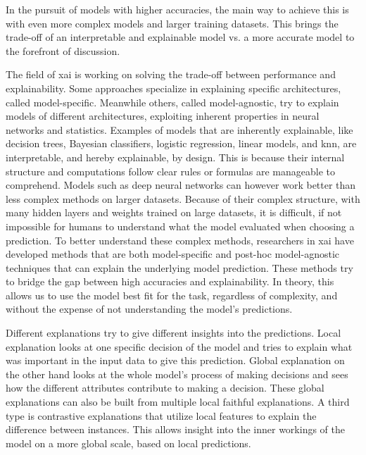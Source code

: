 In the pursuit of models with higher accuracies, the main way to achieve this is with even more complex models and larger training datasets\cite{bianchiniComplexityNeuralNetwork2014}. This brings the trade-off of an interpretable and explainable model vs. a more accurate model\cite{barredoarrietaExplainableArtificialIntelligence2020} to the forefront of discussion. 


The field of \gls{xai} is working on solving the trade-off between performance and explainability. Some approaches specialize in explaining specific architectures, called model-specific. Meanwhile others, called model-agnostic, try to explain models of different architectures, exploiting inherent properties in neural networks and statistics. Examples of models that are inherently explainable, like decision trees, Bayesian classifiers, logistic regression, linear models, and \gls{knn}\cite{fixDiscriminatoryAnalysisNonparametric1989, coverNearestNeighborPattern1967}, are interpretable, and hereby explainable, by design. This is because their internal structure and computations follow clear rules or formulas are manageable to comprehend.
Models such as deep neural networks can however work better than less complex methods on larger datasets. Because of their complex structure, with many hidden layers and weights trained on large datasets, it is difficult, if not impossible for humans to understand what the model evaluated when choosing a prediction. To better understand these complex methods, researchers in \gls{xai} have developed methods that are both model-specific and post-hoc model-agnostic techniques that can explain the underlying model prediction. These methods try to bridge the gap between high accuracies and explainability.
In theory, this allows us to use the model best fit for the task, regardless of complexity, and without the expense of not understanding the model's predictions. 

Different explanations try to give different insights into the predictions. Local explanation looks at one specific decision of the model and tries to explain what was important in the input data to give this prediction. Global explanation on the other hand looks at the whole model's process of making decisions and sees how the different attributes contribute to making a decision. These global explanations can also be built from multiple local faithful explanations. A third type is contrastive explanations that utilize local features to explain the difference between instances. This allows insight into the inner workings of the model on a more global scale, based on local predictions.

